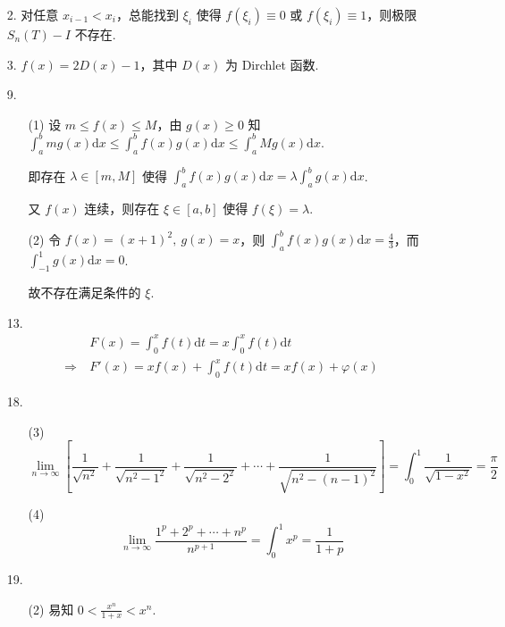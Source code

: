 \documentclass[oneside]{ctexbook} %
\begin{document}
\begin{enumerate}
    \item[2.]
    对任意 $x_{i-1} < x_i$，总能找到 $\xi_i$ 使得 $f(\xi_i) \equiv 0$ 或 $f(\xi_i) \equiv 1$，则极限 $S_n(T) - I$ 不存在.
    \item[3.]
    $f(x) = 2D(x) - 1$，其中 $D(x)$ 为 Dirchlet 函数.
    \item[9.]
    \begin{enumerate}
        \item[(1)]
        设 $m \leqslant f(x) \leqslant M$，由 $g(x) \geqslant 0$ 知 $\int_a^b m g(x) \mathrm dx \leqslant \int_a^b f(x)g(x) \mathrm dx \leqslant \int_a^b M g(x) \mathrm dx$.
        
        即存在 $\lambda \in [m, M]$ 使得 $\int_a^b f(x)g(x) \mathrm dx = \lambda \int_a^b g(x) \mathrm dx$.
        
        又 $f(x)$ 连续，则存在 $\xi \in [a, b]$ 使得 $f(\xi) = \lambda$.
        \item[(2)]
        令 $f(x) = (x+1)^2,\ g(x) = x$，则 $\int_a^b f(x)g(x) \mathrm dx = \frac 4 3$，而 $\int_{-1}^1 g(x) \mathrm dx = 0$.
        
        故不存在满足条件的 $\xi$.
    \end{enumerate}
    \item[13.]
    $$
    \begin{aligned}
        &F(x) = \int_0^x f(t) \mathrm dt = x \int_0^x f(t) \mathrm dt \\ 
        \Rightarrow \ &F'(x) = x f(x) + \int_0^x f(t) \mathrm dt = xf(x) + \varphi(x)
    \end{aligned}
    $$
    \item[18.]
    \begin{enumerate}
        \item[(3)]
        $$
        \lim_{n \to \infty} \left[ \frac 1 {\sqrt{n^2}} + \frac 1 {\sqrt{n^2 - 1^2}} + \frac 1 {\sqrt{n^2 - 2^2}} + \cdots + \frac 1 {\sqrt{n^2 - (n-1)^2}} \right] = \int_0^1 \frac 1 {\sqrt{1 - x^2}} = \frac \pi 2
        $$
        \item[(4)]
        $$
        \lim_{n \to \infty} \frac{1^p + 2^p + \cdots + n^p}{n^{p+1}} = \int_0^1 x^p = \frac 1 {1+p}
        $$
    \end{enumerate}
    \item[19.]
    \begin{enumerate}
        \item[(2)]
        易知 $0 < \frac{x^n}{1+x} < x^n$.
        

\end{enumerate}
\end{enumerate}
\end{document}
